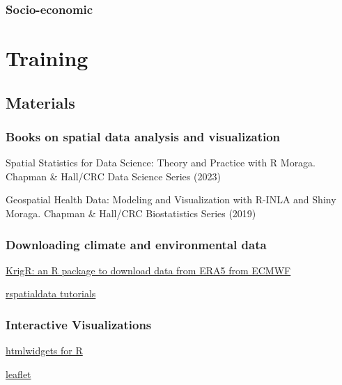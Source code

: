 \documentclass[
  letterpaper,
  DIV=11,
  numbers=noendperiod]{scrreprt}
\begin{document}
\hypertarget{socio-economic-1}{%
\section{Socio-economic}\label{socio-economic-1}}

\part{Training}

\hypertarget{materials}{%
\chapter{Materials}\label{materials}}

\hypertarget{books-on-spatial-data-analysis-and-visualization}{%
\section{Books on spatial data analysis and
visualization}\label{books-on-spatial-data-analysis-and-visualization}}

Spatial Statistics for Data Science: Theory and Practice with R Moraga.
Chapman \& Hall/CRC Data Science Series (2023)

Geospatial Health Data: Modeling and Visualization with R-INLA and Shiny
Moraga. Chapman \& Hall/CRC Biostatistics Series (2019)

\hypertarget{downloading-climate-and-environmental-data}{%
\section{Downloading climate and environmental
data}\label{downloading-climate-and-environmental-data}}

\href{https://github.com/ErikKusch/KrigR}{KrigR: an R package to
download data from ERA5 from ECMWF}

\href{https://rspatialdata.github.io/index.html}{rspatialdata tutorials}

\hypertarget{interactive-visualizations}{%
\section{Interactive Visualizations}\label{interactive-visualizations}}

\href{https://www.htmlwidgets.org/}{htmlwidgets for R}

\href{https://rstudio.github.io/leaflet/}{leaflet}
\end{document}
